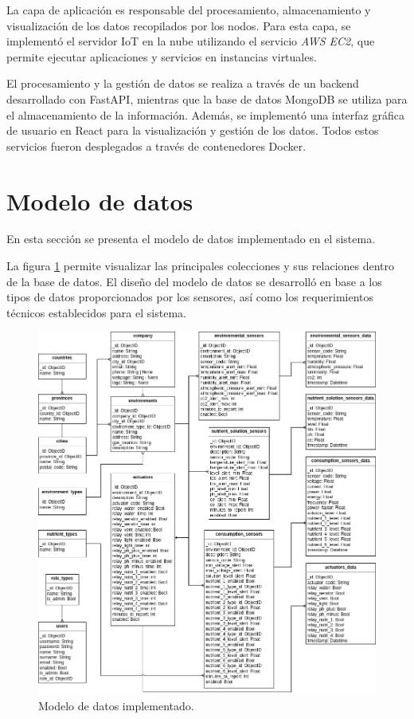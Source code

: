 La capa de aplicación es responsable del procesamiento, almacenamiento y
visualización de los datos recopilados por los nodos. Para esta capa, se
implementó el servidor IoT en la nube utilizando el servicio \textit{AWS EC2},
que permite ejecutar aplicaciones y servicios en instancias virtuales.

El procesamiento y la gestión de datos se realiza a través de un backend
desarrollado con FastAPI, mientras que la base de datos MongoDB se utiliza para
el almacenamiento de la información. Además, se implementó una interfaz gráfica
de usuario en React para la visualización y gestión de los datos. Todos estos
servicios fueron desplegados a través de contenedores Docker.

\section{Modelo de datos}

En esta sección se presenta el modelo de datos implementado en el sistema.

La figura \ref{fig:modelo de datos} permite visualizar las principales
colecciones y sus relaciones dentro de la base de datos. El diseño del modelo
de datos se desarrolló en base a los tipos de datos proporcionados por los
sensores, así como los requerimientos técnicos establecidos para el sistema.

\begin{figure}[H]
    \centering
    \includegraphics[width=.99\textwidth]{./Images/15.png}
    \caption{Modelo de datos implementado.}
    \label{fig:modelo de datos}
\end{figure}

